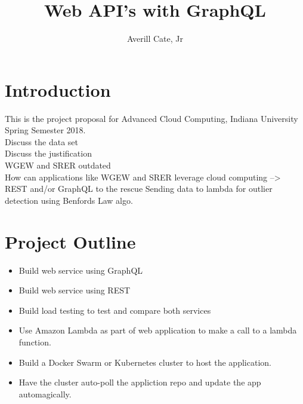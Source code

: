 \documentclass{article}
\title{Web API's with GraphQL}
\author{Averill Cate, Jr}
\begin{document}
\maketitle

\section{Introduction}
This is the project proposal for Advanced Cloud Computing, Indiana University 
Spring Semester 2018.
\\
Discuss the data set\\
Discuss the justification\\
WGEW and SRER outdated\\
How can applications like WGEW and SRER leverage cloud computing --> REST and/or GraphQL to the rescue
Sending data to lambda for outlier detection using Benfords Law algo.

\section{Project Outline}
\begin{itemize}
\item Build web service using GraphQL
\item Build web service using REST
\item Build load testing to test and compare both services
\item Use Amazon Lambda as part of web application to make a call to a lambda function.
\item Build a Docker Swarm or Kubernetes cluster to host the application.
\item Have the cluster auto-poll the appliction repo and update the app automagically.
\end{itemize}
\end{document}
